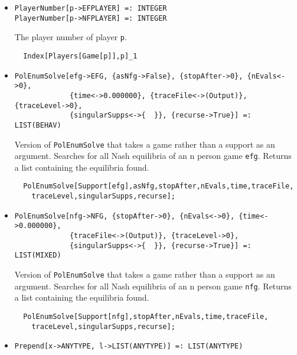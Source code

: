 \begin{itemize}
\item{}
\protect \large \begin{verbatim}
PlayerNumber[p->EFPLAYER] =: INTEGER 
PlayerNumber[p->NFPLAYER] =: INTEGER 
\end{verbatim}\normalsize

\bd 
The player number of player \verb+p+.
\begin{verbatim}
  Index[Players[Game[p]],p]_1
\end{verbatim} 
\ed

\item{}
\protect \large \begin{verbatim}
PolEnumSolve[efg->EFG, {asNfg->False}, {stopAfter->0}, {nEvals<->0}, 
             {time<->0.000000}, {traceFile<->(Output)}, {traceLevel->0}, 
             {singularSupps<->{  }}, {recurse->True}] =: LIST(BEHAV)
\end{verbatim}\normalsize

\bd 
Version of \verb+PolEnumSolve+ that takes a game rather than a support
as an argument.  Searches for all Nash equilibria of an n person game
\verb+efg+.  Returns a list containing the equilibria found.

\begin{verbatim}
  PolEnumSolve[Support[efg],asNfg,stopAfter,nEvals,time,traceFile,
    traceLevel,singularSupps,recurse];
\end{verbatim} 
\ed

\item{}
\protect \large \begin{verbatim}
PolEnumSolve[nfg->NFG, {stopAfter->0}, {nEvals<->0}, {time<->0.000000}, 
             {traceFile<->(Output)}, {traceLevel->0}, 
             {singularSupps<->{  }}, {recurse->True}] =: LIST(MIXED)
\end{verbatim}\normalsize

\bd 
Version of \verb+PolEnumSolve+ that takes a game rather than a support
as an argument.  Searches for all Nash equilibria of an n person game
\verb+nfg+.  Returns a list containing the equilibria found.

\begin{verbatim}
  PolEnumSolve[Support[nfg],stopAfter,nEvals,time,traceFile,
    traceLevel,singularSupps,recurse];
\end{verbatim} 
\ed

\item{}
\protect \large \begin{verbatim}
Prepend[x->ANYTYPE, l->LIST(ANYTYPE)] =: LIST(ANYTYPE) 
\end{verbatim}\normalsize


\end{itemize}
